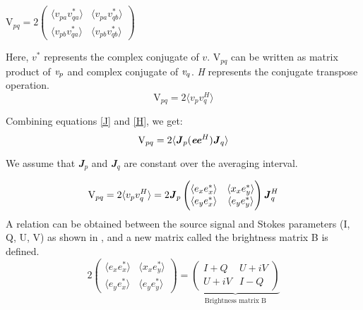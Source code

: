 \documentclass[../main/thesis_msc.tex]{subfiles}
\begin{document}
\begin{center}
\(
\textrm{V}_{pq} = 2
  \begin{pmatrix}
    \langle v_{pa}v^*_{qa} \rangle & \langle v_{pa}v^*_{qb} \rangle \\
    \langle v_{pb}v^*_{qa} \rangle & \langle v_{pb}v^*_{qb} \rangle
  \end{pmatrix}
\)
\end{center}

\noindent Here, $v^*$ represents the complex conjugate of $v$. V$_{pq}$ can be written as matrix product of $\emph{v}_p$ and complex conjugate of $\emph{v}_q$. \textit{H} represents the conjugate transpose operation.
\begin{equation}
\textrm{V}_{pq} = 2\langle v_{p}v^H_{q} \rangle
\label{H}
\end{equation}
 
\noindent Combining equations \ref{J} and \ref{H}, we get:
\begin{equation}
\textrm{V}_{pq} = 2\langle \textbf{\textit{J}}_{p}(\textbf{\textit{ee}}^H) \textbf{\textit{J}}_{q} \rangle
\end{equation}

\noindent We assume that \textbf{\textit{J}}$_{p}$ and \textbf{\textit{J}}$_{q}$  are constant over the averaging interval.

\begin{equation}
\textrm{V}_{pq} = 2\langle v_{p}v^H_{q} \rangle = 2\textbf{\textit{J}}_p \begin{pmatrix}
    \langle e_{x}e^*_{x} \rangle & \langle x_{x}e^*_{y} \rangle \\
    \langle e_{y}e^*_{x} \rangle & \langle e_{y}e^*_{y} \rangle
  \end{pmatrix} \textbf{\textit{J}}^H_q 
\end{equation}
\noindent A relation can be obtained between the source signal and Stokes parameters (I, Q, U, V) as shown in \citep{RIME1}, and a new matrix called the brightness matrix B is defined.
\begin{equation}
2\begin{pmatrix}
    \langle e_{x}e^*_{x} \rangle & \langle x_{x}e^*_{y} \rangle \\
    \langle e_{y}e^*_{x} \rangle & \langle e_{y}e^*_{y} \rangle
  \end{pmatrix}   = \underbrace{ \begin{pmatrix}
    I + Q & U + iV \\
    U + iV & I - Q
  \end{pmatrix} }_{\textrm{Brightness matrix B}}
\end{equation}
\end{document}
